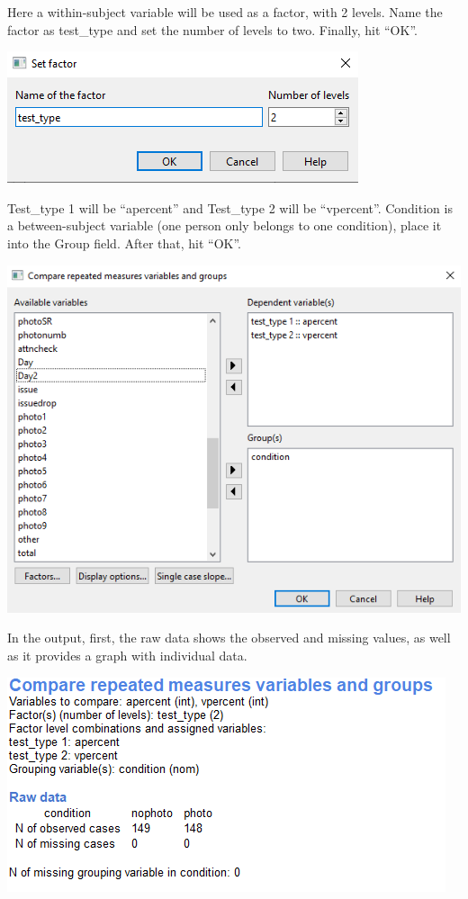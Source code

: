 \documentclass[
]{book}
\begin{document}
Here a within-subject variable will be used as a factor, with 2 levels. Name the factor as test\_type and set the number of levels to two. Finally, hit ``OK''.

\includegraphics{img/ch11/11.3CRMVG_setfactor.png}

Test\_type 1 will be ``apercent'' and Test\_type 2 will be ``vpercent''. Condition is a between-subject variable (one person only belongs to one condition), place it into the Group field. After that, hit ``OK''.

\includegraphics{img/ch11/11.3CRMVG_setvariables.png}

In the output, first, the raw data shows the observed and missing values, as well as it provides a graph with individual data.

\includegraphics{img/ch11/11.3CRMVG_raw.png}
\end{document}
